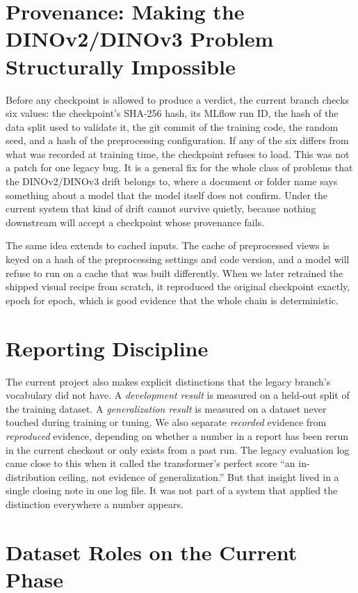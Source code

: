 \section{Provenance: Making the DINOv2/DINOv3 Problem Structurally Impossible}

Before any checkpoint is allowed to produce a verdict, the current branch
checks six values: the checkpoint's SHA-256 hash, its MLflow run ID, the hash
of the data split used to validate it, the git commit of the training code, the
random seed, and a hash of the preprocessing configuration. If any of the six
differs from what was recorded at training time, the checkpoint refuses to
load. This was not a patch for one legacy bug. It is a general fix for the
whole class of problems that the DINOv2/DINOv3 drift belongs to, where a
document or folder name says something about a model that the model itself
does not confirm. Under the current system that kind of drift cannot survive
quietly, because nothing downstream will accept a checkpoint whose provenance
fails.

The same idea extends to cached inputs. The cache of preprocessed views is
keyed on a hash of the preprocessing settings and code version, and a model
will refuse to run on a cache that was built differently. When we later
retrained the shipped visual recipe from scratch, it reproduced the original
checkpoint exactly, epoch for epoch, which is good evidence that the whole
chain is deterministic.

\section{Reporting Discipline}

The current project also makes explicit distinctions that the legacy branch's
vocabulary did not have. A \emph{development result} is measured on a held-out
split of the training dataset. A \emph{generalization result} is measured on a
dataset never touched during training or tuning. We also separate
\emph{recorded} evidence from \emph{reproduced} evidence, depending on whether a
number in a report has been rerun in the current checkout or only exists from a
past run. The legacy evaluation log came close to this when it called the
transformer's perfect score ``an in-distribution ceiling, not evidence of
generalization.'' But that insight lived in a single closing note in one log
file. It was not part of a system that applied the distinction everywhere a
number appears.

\section{Dataset Roles on the Current Phase}

